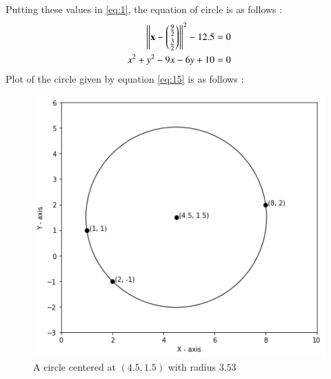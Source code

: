 \documentclass[journal,12pt,twocolumn]{IEEEtran}
\begin{document}
Putting these values in \eqref{eq:1}, the equation of circle is as follows : 
\begin{align}
\left\lVert\mathbf{x}-\begin{pmatrix}\frac{9}{2}\\[0.1cm]\frac{3}{2}\end{pmatrix}\right\rVert^2-12.5&=0\label{eq:14}\\
x^2+y^2-9x-6y+10&=0\label{eq:15}
\end{align}
Plot of the circle given by equation \eqref{eq:15} is as follows :
\begin{figure}[h]
\centering
    \includegraphics[width=\columnwidth]{circle2.png}
    \caption{A circle centered at $(4.5, 1.5)$ with radius $3.53$}
    \label{circle}
\end{figure}
\end{document}
